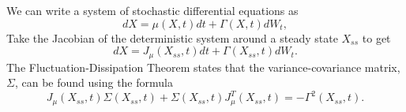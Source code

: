 We can write a system of stochastic differential equations
as
\[
dX=\mu(X,t)dt+\Gamma(X,t)dW_{t},
\]
Take the Jacobian of the deterministic system around a steady state $X_{ss}$ to get
\[
dX=J_{\mu}(X_{ss},t)dt+\Gamma(X_{ss},t)dW_{t}.
\]
The Fluctuation-Dissipation Theorem states that the variance-covariance matrix, $\Sigma$, can be found using the formula
\[
J_{\mu}(X_{ss},t)\Sigma(X_{ss},t)+\Sigma(X_{ss},t)J_{\mu}^{T}(X_{ss},t)=-\Gamma^{2}(X_{ss},t).
\]
 